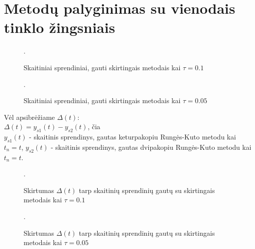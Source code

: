 \documentclass[]{VUMIFTemplateClass}
\newcommand{\tone}{0.1}
\newcommand{\ttwo}{0.05}
\begin{document}
\section{Metodų palyginimas su vienodais tinklo žingsniais}

\begin{figure}[H]
    \begin{center}
        
    \end{center}
    \caption{Skaitiniai sprendiniai, gauti skirtingais metodais kai $\tau = \tone$}.
\end{figure}

\begin{figure}[H]
    \begin{center}
        
    \end{center}
    \caption{Skaitiniai sprendiniai, gauti skirtingais metodais kai $\tau = \ttwo$}.
\end{figure}

Vėl apsibrėžiame $\Delta(t)$:\\
$\Delta(t) = y_{s1}(t) - y_{s2}(t)$, čia\\
$y_{s1}(t)$ - skaitinis sprendinys, gautas keturpakopiu Rungės-Kuto metodu kai $t_n = t$,
$y_{s2}(t)$ - skaitinis sprendinys, gautas dvipakopiu Rungės-Kuto metodu kai $t_n = t$.

\begin{figure}[H]
    \begin{center}
        
    \end{center}
    \caption{Skirtumas $\Delta(t)$ tarp skaitinių sprendinių gautų su skirtingais metodais kai $\tau = \tone$}.
\end{figure}

\begin{figure}[H]
    \begin{center}
        
    \end{center}
    \caption{Skirtumas $\Delta(t)$ tarp skaitinių sprendinių gautų su skirtingais metodais kai $\tau = \ttwo$}.
\end{figure}
\end{document}
